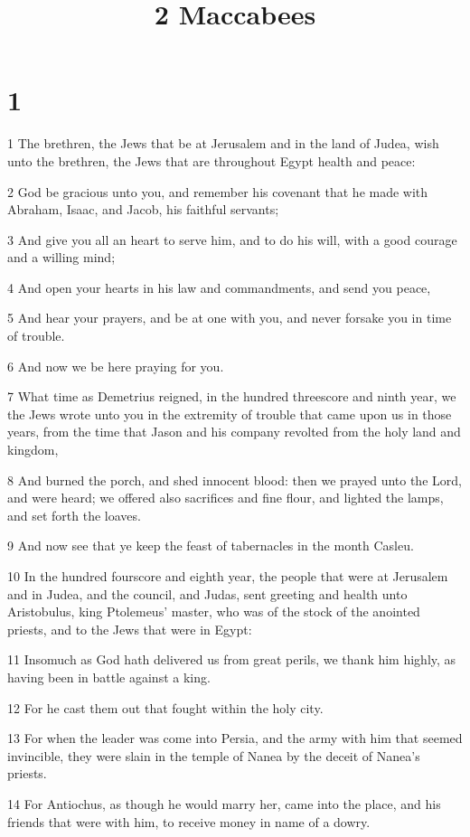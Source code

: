 

\title{2 Maccabees}


\chapter{1}

\par 1 The brethren, the Jews that be at Jerusalem and in the land of Judea, wish unto the brethren, the Jews that are throughout Egypt health and peace:
\par 2 God be gracious unto you, and remember his covenant that he made with Abraham, Isaac, and Jacob, his faithful servants;
\par 3 And give you all an heart to serve him, and to do his will, with a good courage and a willing mind;
\par 4 And open your hearts in his law and commandments, and send you peace,
\par 5 And hear your prayers, and be at one with you, and never forsake you in time of trouble.
\par 6 And now we be here praying for you.
\par 7 What time as Demetrius reigned, in the hundred threescore and ninth year, we the Jews wrote unto you in the extremity of trouble that came upon us in those years, from the time that Jason and his company revolted from the holy land and kingdom,
\par 8 And burned the porch, and shed innocent blood: then we prayed unto the Lord, and were heard; we offered also sacrifices and fine flour, and lighted the lamps, and set forth the loaves.
\par 9 And now see that ye keep the feast of tabernacles in the month Casleu.
\par 10 In the hundred fourscore and eighth year, the people that were at Jerusalem and in Judea, and the council, and Judas, sent greeting and health unto Aristobulus, king Ptolemeus' master, who was of the stock of the anointed priests, and to the Jews that were in Egypt:
\par 11 Insomuch as God hath delivered us from great perils, we thank him highly, as having been in battle against a king.
\par 12 For he cast them out that fought within the holy city.
\par 13 For when the leader was come into Persia, and the army with him that seemed invincible, they were slain in the temple of Nanea by the deceit of Nanea's priests.
\par 14 For Antiochus, as though he would marry her, came into the place, and his friends that were with him, to receive money in name of a dowry.
